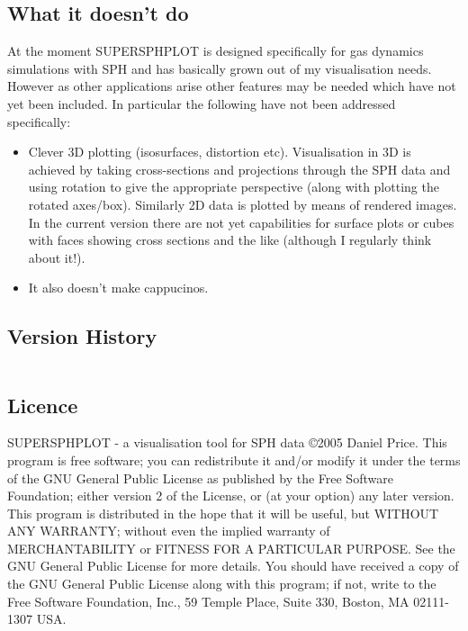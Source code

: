 \documentclass[a4paper,11pt]{article}
\begin{document}
\subsection{What it doesn't do}
At the moment SUPERSPHPLOT is designed specifically for gas dynamics
simulations with SPH and has basically grown out of my visualisation needs.
However as other applications arise other features may be needed which have not
yet been included. In particular the following have not been addressed
specifically:
\begin{itemize}
\item Clever 3D plotting (isosurfaces, distortion etc). Visualisation in 3D is achieved by taking cross-sections and projections through the SPH data and using rotation to give the appropriate perspective (along with plotting the rotated axes/box). Similarly 2D data is plotted by means of
rendered images. In the current version there are not yet capabilities for surface plots or cubes
with faces showing cross sections and the like (although I regularly think about it!).
\item It also doesn't make cappucinos.
\end{itemize}

\subsection{Version History}

\begin{tabular}{|l|l|p{}|}
\hline

\hline
\end{tabular}

\subsection{Licence}
SUPERSPHPLOT - a visualisation tool for SPH data \copyright 2005 Daniel Price.
 This program is free software; you can redistribute it and/or modify it under the terms of the GNU General Public License as published by the Free Software Foundation; either version 2 of the License, or (at your option) any later version. This program is distributed in the hope that it will be useful, but WITHOUT ANY WARRANTY; without even the implied warranty of MERCHANTABILITY or FITNESS FOR A PARTICULAR PURPOSE.  See the GNU General Public License for more details. You should have received a copy of the GNU General Public License along with this program; if not, write to the Free Software Foundation, Inc., 59 Temple Place, Suite 330, Boston, MA  02111-1307  USA.
\end{document}
